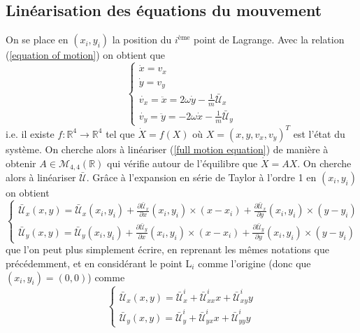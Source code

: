 \documentclass[12pt]{article}
\theoremstyle{definition}
\theoremstyle{definition}
\begin{document}
	\subsection{Linéarisation des équations du mouvement}
	On se place en $(x_i,y_i)$ la position du $i^{\text{ème}}$ point de Lagrange. Avec la relation (\ref{equation of motion}) on obtient que
	\begin{equation}
		\label{full motion equation}
		\begin{cases}
			\dot{x} = v_x
			\\
			\dot{y} = v_y
			\\
			\dot{v_x} = \ddot{x} = 2\omega\dot{y} - \frac{1}{m}\bar{\mathcal{U}}_x
			\\
			\dot{v_y} = \ddot{y} = - 2\omega\dot{x} - \frac{1}{m}\bar{\mathcal{U}}_y
		\end{cases}
	\end{equation}
	i.e. il existe $f: \mathbb{R}^4 \longrightarrow \mathbb{R}^4$ tel que $\dot{X} = f(X)$ où $X = (x,y,v_x,v_y)^T$ est l'état du système. On cherche alors à linéariser (\ref{full motion equation}) de manière à obtenir $A \in \mathcal{M}_{4,4}(\mathbb{R})$ qui vérifie autour de l'équilibre que $\dot{X} = AX$. On cherche alors à linéariser $\bar{\mathcal{U}}$. Grâce à l'expansion en série de Taylor à l'ordre 1 en $(x_i,y_i)$ on obtient
	\begin{equation}
		\begin{cases}
			\bar{\mathcal{U}}_x(x,y) = \bar{\mathcal{U}}_x(x_i,y_i) + \frac{\partial \bar{\mathcal{U}}_x}{\partial x} (x_i,y_i) \times (x - x_i) + \frac{\partial \bar{\mathcal{U}}_x}{\partial y} (x_i,y_i) \times (y - y_i)
			\\
			\bar{\mathcal{U}}_y(x,y) = \bar{\mathcal{U}}_y(x_i,y_i) + \frac{\partial \bar{\mathcal{U}}_y}{\partial x} (x_i,y_i) \times (x - x_i) + \frac{\partial \bar{\mathcal{U}}_y}{\partial y} (x_i,y_i) \times (y - y_i)
		\end{cases}
	\end{equation}
	que l'on peut plus simplement écrire, en reprenant les mêmes notations que précédemment, et en considérant le point L$_i$ comme l'origine (donc que $(x_i,y_i)=(0,0)$) comme
		\begin{equation}
		\begin{cases}
			\bar{\mathcal{U}}_x(x,y) = \bar{\mathcal{U}}_x^i + 
			\bar{\mathcal{U}}_{xx}^i x + 
			\bar{\mathcal{U}}_{xy}^i y
			\\
			\bar{\mathcal{U}}_y(x,y) = \bar{\mathcal{U}}_y^i +  
			\bar{\mathcal{U}}_{yx}^{i} x + 
			\bar{\mathcal{U}}_{yy}^{i} y
		\end{cases}
	\end{equation}
	
\end{document}
